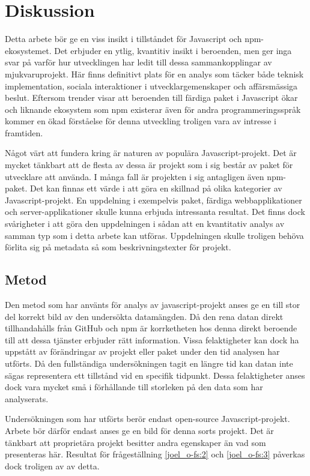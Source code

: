 \section{Diskussion}
\label{sec:joel_o-discussion}
Detta arbete bör ge en viss insikt i tillståndet för Javascript och npm-ekosystemet. Det erbjuder en ytlig, kvantitiv insikt i beroenden, men ger inga svar på varför hur utvecklingen har ledit till dessa sammankopplingar av mjukvaruprojekt. Här finns definitivt plats för en analys som täcker både teknisk implementation, sociala interaktioner i utvecklargemenskaper och affärsmässiga beslut. Eftersom trender visar att beroenden till färdiga paket i Javascript ökar\cite{Wittern:2016} och liknande ekosystem som npm existerar även för andra programmeringsspråk kommer en ökad förståelse för denna utveckling troligen vara av intresse i framtiden.

Något värt att fundera kring är naturen av populära Javascript-projekt. Det är mycket tänkbart att de flesta av dessa är projekt som i sig består av paket för utvecklare att använda. I många fall är projekten i sig antagligen även npm-paket. Det kan finnas ett värde i att göra en skillnad på olika kategorier av Javascript-projekt. En uppdelning i exempelvis paket, färdiga webbapplikationer och server-applikationer skulle kunna erbjuda intressanta resultat. Det finns dock svårigheter i att göra den uppdelningen i sådan att en kvantitativ analys av samman typ som i detta arbete kan utföras. Uppdelningen skulle troligen behöva förlita sig på metadata så som beskrivningstexter för projekt.

\subsection{Metod}
\label{subsec:joel_o-discussion-method}
Den metod som har använts för analys av javascript-projekt anses ge en till stor del korrekt bild av den undersökta datamängden. Då den rena datan direkt tillhandahålls från GitHub och npm är korrketheten hos denna direkt beroende till att dessa tjänster erbjuder rätt information. Vissa felaktigheter kan dock ha uppstått av förändringar av projekt eller paket under den tid analysen har utförts. Då den fullständiga undersökningen tagit en längre tid kan datan inte sägas representera ett tillstånd vid en specifik tidpunkt. Dessa felaktigheter anses dock vara mycket små i förhållande till storleken på den data som har analyserats.

Undersökningen som har utförts berör endast open-source Javascript-projekt. Arbete bör därför endast anses ge en bild för denna sorts projekt. Det är tänkbart att proprietära projekt besitter andra egenskaper än vad som presenteras här. Resultat för frågeställning \ref{joel_o-fs:2} och \ref{joel_o-fs:3} påverkas dock troligen av av detta.

